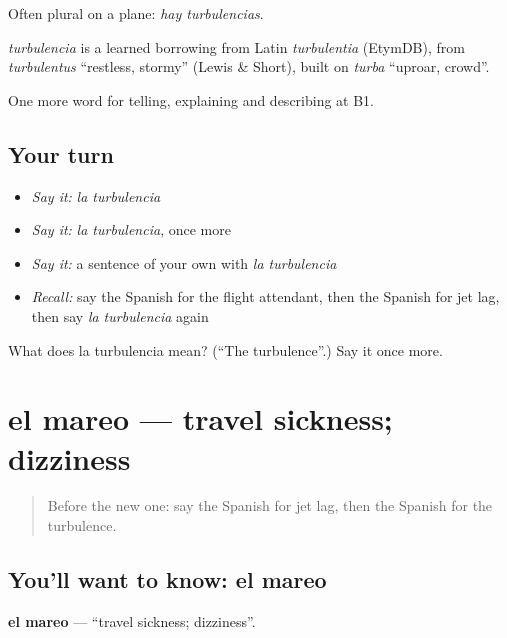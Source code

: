 Often plural on a plane: \emph{hay turbulencias}.

\begin{cousinweb}
\emph{turbulencia} is a learned borrowing from Latin \emph{turbulentia} (EtymDB), from \emph{turbulentus} \textquotedblleft{}restless, stormy\textquotedblright{} (Lewis \& Short), built on \emph{turba} \textquotedblleft{}uproar, crowd\textquotedblright{}.
\end{cousinweb}

\begin{grammarlens}[title={What you've built}]
One more word for telling, explaining and describing at B1.
\end{grammarlens}

\subsection*{Your turn}
\begin{itemize}
\raggedright
  \item \emph{Say it:} \emph{la turbulencia}
  \item \emph{Say it:} \emph{la turbulencia}, once more
  \item \emph{Say it:} a sentence of your own with \emph{la turbulencia}
  \item \emph{Recall:} say the Spanish for the flight attendant, then the Spanish for jet lag, then say \emph{la turbulencia} again
\end{itemize}

\begin{tcolorbox}[breakable,colback=teal!4,colframe=teal!35!black,title={Before you move on}]
What does la turbulencia mean? (\textquotedblleft{}The turbulence\textquotedblright{}.) Say it once more.
\end{tcolorbox}
\section[el mareo]{el mareo — travel sickness; dizziness}

\label{lesson:ES-C655-mareo}



\begin{quote}
Before the new one: say the Spanish for jet lag, then the Spanish for the turbulence.
\end{quote}

\subsection*{You'll want to know: el mareo}
\textbf{el mareo} — \textquotedblleft{}travel sickness; dizziness\textquotedblright{}.

